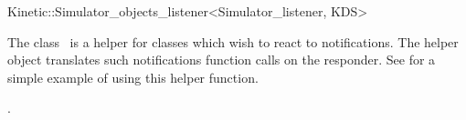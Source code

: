 

\begin{ccRefClass}{Kinetic::Simulator_objects_listener<Simulator_listener, KDS>}  %


\ccDefinition
  
The class \ccRefName\ is a helper for classes which wish to react to
 notifications. The helper
object translates such notifications  function calls
on the responder. See  for a
simple example of using this helper function.



\ccCreation
{}  %


\ccSeeAlso

.


\end{ccRefClass}


